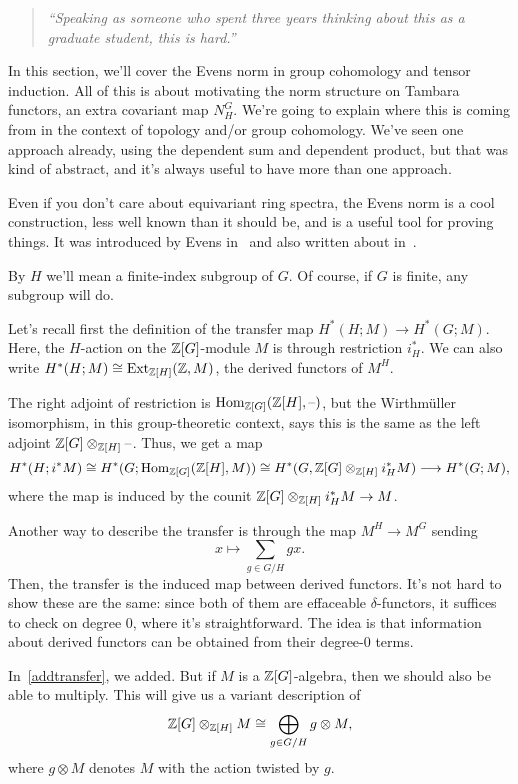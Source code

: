 \begin{quote}\textit{
	``Speaking as someone who spent three years thinking about this as a graduate student, this is hard.''
}\end{quote}
\label{evenssec}
In this section, we'll cover the Evens norm in group cohomology and tensor induction.  All of this is about
motivating the norm structure on Tambara functors, an extra covariant map $N_H^G$. We're going to explain where
this is coming from in the context of topology and/or group cohomology. We've seen one approach already, using the
dependent sum and dependent product, but that was kind of abstract, and it's always useful to have more than one
approach.

Even if you don't care about equivariant ring spectra, the Evens norm is a cool construction, less well known than
it should be, and is a useful tool for proving things. It was introduced by Evens in~ and also written
about in~.

By $H$ we'll mean a finite-index subgroup of $G$. Of course, if $G$ is finite, any subgroup will do.

Let's recall first the definition of the transfer map $H^*(H;M)\to H^*(G;M)$. Here, the $H$-action on the
$\mathbb Z[G]$-module $M$ is through restriction $i_H^*$. We can also write $H^*(H;M)\cong\operatorname{Ext}_{\mathbb Z[H]}(\mathbb Z, M)$, the
derived functors of $M^H$.

The right adjoint of restriction is $\operatorname{Hom}_{\mathbb Z[G]}(\mathbb Z[H], \text{--})$, but the Wirthmüller isomorphism, in this
group-theoretic context, says this is the same as the left adjoint $\mathbb Z[G]\otimes_{\mathbb Z[H]}\text{--}$. Thus, we get a map
\[H^*(H; i^*M)\cong H^*(G; \operatorname{Hom}_{\mathbb Z[G]}(\mathbb Z[H], M))\cong H^*(G, \mathbb Z[G]\otimes_{\mathbb Z[H]} i_H^*M)\longrightarrow
H^*(G;M),\]
where the map is induced by the counit $\mathbb Z[G]\otimes_{\mathbb Z[H]} i_H^*M\to M$.

Another way to describe the transfer is through the map $M^H\to M^G$ sending
\begin{equation}
\label{addtransfer}
x\mapsto \sum_{g\in G/H} gx.
\end{equation}
Then, the transfer is the induced map between derived functors. It's not hard to show these are the same: since
both of them are effaceable $\delta$-functors, it suffices to check on degree $0$, where it's straightforward. The
idea is that information about derived functors can be obtained from their degree-$0$ terms.

In~\eqref{addtransfer}, we added. But if $M$ is a $\mathbb Z[G]$-algebra, then we should also be able to multiply. This
will give us a variant description of
\[\mathbb Z[G]\otimes_{\mathbb Z[H]} M\cong \bigoplus_{g\in G/H} g\otimes M,\]
where $g\otimes M$ denotes $M$ with the action twisted by $g$.

